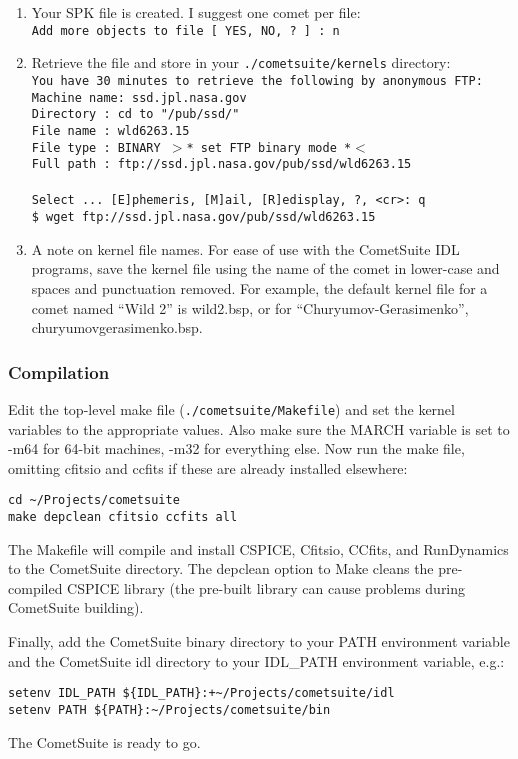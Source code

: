 \documentclass[12pt,letterpaper]{article}
\newcommand\rundynamics{RunDynamics}
\newcommand\cs{CometSuite}
\begin{document}
\begin{enumerate}
\item Your SPK file is created.  I suggest one comet per file:\\
\texttt{Add more objects to file  [ YES, NO, ? ] : n}

\item Retrieve the file and store in your
\texttt{./cometsuite/kernels} directory:\\
\texttt{You have 30 minutes to retrieve the following by anonymous FTP:\\
  Machine name:  ssd.jpl.nasa.gov\\
  Directory   :  cd to "/pub/ssd/"\\
  File name   :  wld6263.15\\
  File type   :  BINARY   $>$* set FTP binary mode *$<$\\
  Full path   :  ftp://ssd.jpl.nasa.gov/pub/ssd/wld6263.15\\
\\
Select ... [E]phemeris, [M]ail, [R]edisplay, ?, <cr>: q\\
\$ wget ftp://ssd.jpl.nasa.gov/pub/ssd/wld6263.15}

\item A note on kernel file names. For ease of use with the \cs{}
IDL programs, save the kernel file using the name of the comet in
lower-case and spaces and punctuation removed. For example, the
default kernel file for a comet named ``Wild 2'' is wild2.bsp, or for
``Churyumov-Gerasimenko'', churyumovgerasimenko.bsp.
\end{enumerate}

\subsubsection{Compilation}
Edit the top-level make file (\texttt{./cometsuite/Makefile}) and set
the kernel variables to the appropriate values.  Also make sure the
MARCH variable is set to -m64 for 64-bit machines, -m32 for everything
else.  Now run the make file, omitting cfitsio and ccfits if these are
already installed elsewhere:
\begin{lstlisting}
cd ~/Projects/cometsuite
make depclean cfitsio ccfits all
\end{lstlisting}
The Makefile will compile and install CSPICE, Cfitsio, CCfits, and
\rundynamics{} to the \cs{} directory.  The depclean option to Make
cleans the pre-compiled CSPICE library (the pre-built library can
cause problems during \cs{} building).

Finally, add the \cs{} binary directory to your PATH environment
variable and the \cs{} idl directory to your IDL\_PATH environment
variable, e.g.:
\begin{lstlisting}
setenv IDL_PATH ${IDL_PATH}:+~/Projects/cometsuite/idl
setenv PATH ${PATH}:~/Projects/cometsuite/bin
\end{lstlisting}
The \cs{} is ready to go.
\end{document}
